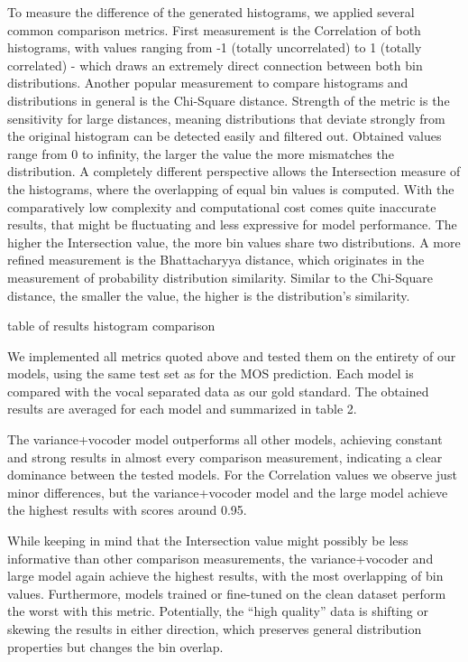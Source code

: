 \documentclass[a4paper]{article}
\begin{document}
	To measure the difference of the generated histograms, we applied several common comparison metrics. First measurement is the Correlation of both histograms, with values ranging from -1 (totally uncorrelated) to 1 (totally correlated) - which draws an extremely direct connection between both bin distributions. Another popular measurement to compare histograms and distributions in general is the Chi-Square distance. Strength of the metric is the sensitivity for large distances, meaning distributions that deviate strongly from the original histogram can be detected easily and filtered out. Obtained values range from 0 to infinity, the larger the value the more mismatches the distribution. A completely different perspective allows the Intersection measure of the histograms, where the overlapping of equal bin values is computed. With the comparatively low complexity and computational cost comes quite inaccurate results, that might be fluctuating and less expressive for model performance. The higher the Intersection value, the more bin values share two distributions. A more refined measurement is the Bhattacharyya distance, which originates in the measurement of probability distribution similarity. Similar to the Chi-Square distance, the smaller the value, the higher is the distribution’s similarity. 
	
	\color{red}table of results histogram comparison\color{black}
	
	We implemented all metrics quoted above and tested them on the entirety of our models, using the same test set as for the MOS prediction. Each model is compared with the vocal separated data as our gold standard. The obtained results are averaged for each model and summarized in \color{red}table 2\color{black}. 
	
	The variance+vocoder model outperforms all other models, achieving constant and strong results in almost every comparison measurement, indicating a clear dominance between the tested models. 
	For the Correlation values we observe just minor differences, but the variance+vocoder model and the large model achieve the highest results with scores around 0.95. 
	
	While keeping in mind that the Intersection value might possibly be less informative than other comparison measurements, the variance+vocoder and large model again achieve the highest results, with the most overlapping of bin values. Furthermore, models trained or fine-tuned on the clean dataset perform the worst with this metric. Potentially, the “high quality” data is shifting or skewing the results in either direction, which preserves general distribution properties but changes the bin overlap.
	
\end{document}
